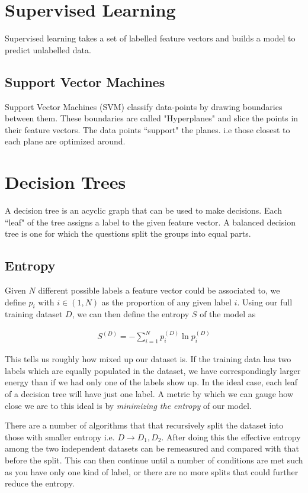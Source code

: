 \section{Supervised Learning}
Supervised learning takes a set of labelled feature vectors and builds a model to predict unlabelled data. 



\subsection{Support Vector Machines}\label{sub:svm}
Support Vector Machines (SVM) classify data-points by drawing boundaries between them. These boundaries are called "Hyperplanes" and slice the points in their feature vectors. The data points “support" the planes. i.e those closest to each plane are optimized around.

\section{Decision Trees}
A decision tree is an acyclic graph that can be used to make decisions. Each ``leaf" of the tree assigns a label to the given feature vector. A balanced decision tree is one for which the questions split the groups into equal parts.

\subsection{Entropy}
Given $N$ different possible labels a feature vector could be associated to, we define $p_i$ with $i\in (1,N)$ as the proportion of any given label $i$. Using our full training dataset $D$, we can then define the entropy $S$ of the model as 

\begin{align}
	S^{(D)} = -\sum_{i=1}^N p^{(D)}_i\ln p^{(D)}_i
\end{align}

This tells us roughly how mixed up our dataset is. If the training data has two labels which are equally populated in the dataset, we have correspondingly larger energy than if we had only one of the labels show up. In the ideal case, each leaf of a decision tree will have just one label. A metric by which we can gauge how close we are to this ideal is by \emph{minimizing the entropy} of our model. 

There are a number of algorithms that that recursively split the dataset into those with smaller entropy i.e. $D\rightarrow D_1, D_2$. After doing this the effective entropy among the two independent datasets can be remeasured and compared with that before the split. This can then continue until a number of conditions are met such as you have only one kind of label, or there are no more splits that could further reduce the entropy.

